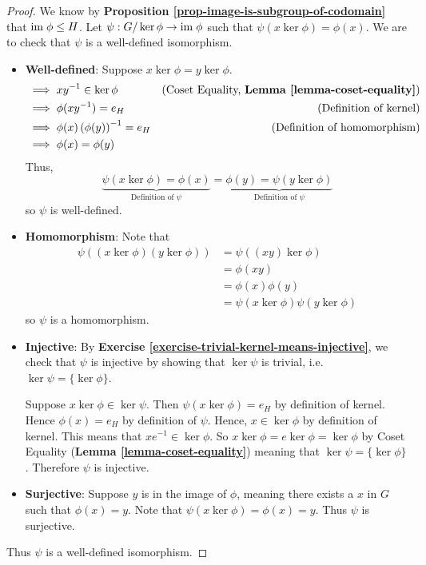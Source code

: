 \begin{proof}
    We know by \textbf{Proposition \ref{prop-image-is-subgroup-of-codomain}} that $\mathrm{im}\;\phi \leq H$. Let $\psi: G/\ker\phi \to \mathrm{im}\;\phi$ such that $\psi(x\ker\phi) = \phi(x)$. We are to check that $\psi$ is a well-defined isomorphism.
    \begin{itemize}
        \item \textbf{Well-defined}: Suppose $x\ker\phi = y\ker\phi$.
        \begin{align*}
            &\implies xy^{-1} \in \ker\phi & (\text{Coset Equality, \textbf{Lemma \ref{lemma-coset-equality}}})\\
            &\implies\phi(xy^{-1}) = e_H & (\text{Definition of kernel})\\
            &\implies\phi(x)\left(\phi(y)\right)^{-1} = e_H & (\text{Definition of homomorphism})\\
            &\implies\phi(x) = \phi(y)
        \end{align*}
        Thus,
        \[
            \underbrace{\psi(x\ker\phi) = \phi(x)}_{\text{Definition of } \psi} = \underbrace{\phi(y) = \psi(y\ker\phi)}_{\text{Definition of } \psi}
        \]
        so $\psi$ is well-defined.

        \item \textbf{Homomorphism}: Note that
        \begin{align*}
            \psi((x\ker\phi)(y\ker\phi)) &= \psi((xy)\ker\phi)\\
            &= \phi(xy)\\
            &= \phi(x)\phi(y)\\
            &= \psi(x\ker\phi)\psi(y\ker\phi)
        \end{align*}
        so $\psi$ is a homomorphism.
        \item \textbf{Injective}: By \textbf{Exercise \ref{exercise-trivial-kernel-means-injective}}, we check that $\psi$ is injective by showing that $\ker\psi$ is trivial, i.e. $\ker\psi = \{\ker\phi\}$.

        Suppose $x\ker\phi\in\ker\psi$. Then $\psi(x\ker\phi) = e_H$ by definition of kernel. Hence $\phi(x) = e_H$ by definition of $\psi$. Hence, $x \in \ker\phi$ by definition of kernel. This means that $xe^{-1} \in \ker\phi$. So $x\ker\phi = e\ker\phi = \ker\phi$ by Coset Equality (\textbf{Lemma \ref{lemma-coset-equality}}) meaning that $\ker\psi = \{\ker\phi\}$. Therefore $\psi$ is injective.

        \item \textbf{Surjective}: Suppose $y$ is in the image of $\phi$, meaning there exists a $x$ in $G$ such that $\phi(x) = y$. Note that $\psi(x\ker\phi) = \phi(x) = y$. Thus $\psi$ is surjective.
    \end{itemize}
    Thus $\psi$ is a well-defined isomorphism.


\end{proof}
